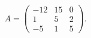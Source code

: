 \documentclass{ximera}
\begin{document}
\begin{exercise} \label{c10.4.7d}
\begin{equation*}
A = \left(\begin{array}{rrr}
   -12 &    15 &     0\\
     1 &     5 &     2\\
    -5 &     1 &     5
\end{array}\right).
\end{equation*}
\end{exercise}
\end{document}
